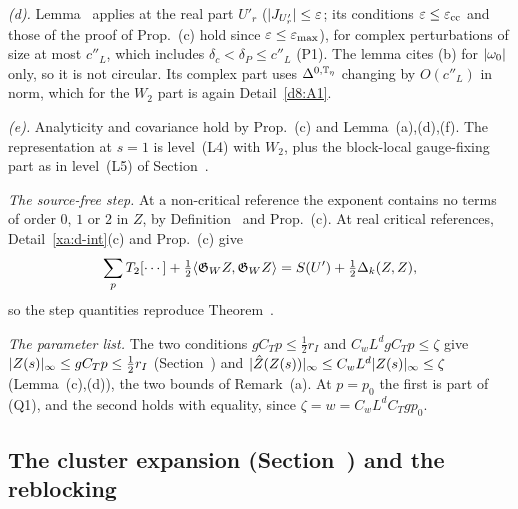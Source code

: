 \begin{detail}
\emph{(d).} Lemma~ applies at the real part $U'_r$ ($\lvert J_{U'_r}\rvert\le\varepsilon$; its conditions $\varepsilon\le\varepsilon_{\rm cc}$ and those of the proof of Prop.~(c) hold since $\varepsilon\le\varepsilon_{\max}$), for complex perturbations of size at most $c''_L$, which includes $\delta_c<\delta_P\le c''_L$ (P1). The lemma cites (b) for $\lvert\omega_0\rvert$ only, so it is not circular. Its complex part uses $\Delta^{0,\mathbb T_\eta}$ changing by $O(c''_L)$ in norm, which for the $W_2$ part is again Detail~\ref{d8:A1}.

\emph{(e).} Analyticity and covariance hold by Prop.~(c) and Lemma~(a),(d),(f). The representation at $s=1$ is level~(L4) with $W_2$, plus the block-local gauge-fixing part as in level~(L5) of Section~.
\end{detail}

\begin{detail}\label{xa:d-sq-out}
\emph{The source-free step.} At a non-critical reference the exponent contains no terms of order $0$, $1$ or $2$ in $Z$, by Definition~ and Prop.~(c). At real critical references, Detail~\ref{xa:d-int}(c) and Prop.~(c) give
\[
\sum_pT_2[\cdots]+\tfrac12\langle \mathfrak G_WZ,\mathfrak G_WZ\rangle=S(U')+\tfrac12\Delta_k(Z,Z),
\]
so the step quantities reproduce Theorem~.

\emph{The parameter list.} The two conditions $gC_Tp\le\frac12r_I$ and $C_wL^dgC_Tp\le\zeta$ give $\lvert Z(s)\rvert_\infty\le gC_Tp\le\frac12r_I$ (Section~) and $\lvert\hat Z(Z(s))\rvert_\infty\le C_wL^d\lvert Z(s)\rvert_\infty\le\zeta$ (Lemma~(c),(d)), the two bounds of Remark~(a). At $p=p_0$ the first is part of (Q1), and the second holds with equality, since $\zeta=w=C_wL^dC_Tgp_0$.
\end{detail}

\subsection{The cluster expansion (Section~\texorpdfstring{}{48}) and the reblocking}\label{xa:sec-cl}

